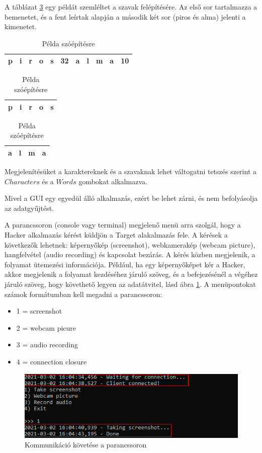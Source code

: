\documentclass[12pt,a4paper,oneside]{report}
\begin{document}
A táblázat \ref{tab:karlanc} egy példát szemléltet a szavak felépítésére. Az első sor tartalmazza a bemenetet, és a fent leírtak alapján a második két sor (piros és alma) jelenti a kimenetet.
\begin{table}[H]
\caption{Példa szóépítésre}
\label{tab:karlanc}
\hspace{7em}
\begin{tabular}{|c|c|c|c|c|c|c|c|c|c|c|}
\hline
p&i&r&o&s&32&a&l&m&a&10\\
\hline
\end{tabular}
\vspace{5pt}

\hspace{7em}
\begin{tabular}{|c|c|c|c|c|}
\hline
p&i&r&o&s\\
\hline
\end{tabular}
\vspace{5pt}

\hspace{7em}
\begin{tabular}{|c|c|c|c|}
\hline
a&l&m&a\\
\hline
\end{tabular}
\end{table}
Megjelenítésüket a karaktereknek és a szavaknak lehet váltogatni tetszés szerint a $Characters$ és a $Words$ gombokat alkalmazva.

Mivel a GUI egy egyedül álló alkalmazás, ezért be lehet zárni, és nem befolyásolja az adatgyűjtést.

A parancssoron (console vagy terminal) megjelenő menü arra szolgál, hogy a Hacker alkalmazás kérést küldjön a Target alakalmazás fele. A kérések a következők lehetnek: képernyőkép (screenshot), webkamerakép (webcam picture), hangfelvétel (audio recording) és kapcsolat bezárás. A kérés közben megjelenik, a folyamat ütemezési információja. Például, ha egy képernyőképet kér a Hacker, akkor megjelenik a folyamat kezdéséhez járuló szöveg, és a befejezésénél a végéhez járuló szöveg, hogy követhető legyen az adatátvitel, lásd ábra \ref{fig:logging}. A menüpontokat számok formátumban kell megadni a parancssoron:
\begin{itemize}
\item 1 = screenshot
\item 2 = webcam picure
\item 3 = audio recording
\item 4 = connection closure
\end{itemize}
\begin{figure}[H]
\centering
\includegraphics[width=400pt]{../images/tempsnip}
\caption{Kommunikáció követése a parancssoron}
\label{fig:logging}
\end{figure}
\end{document}
